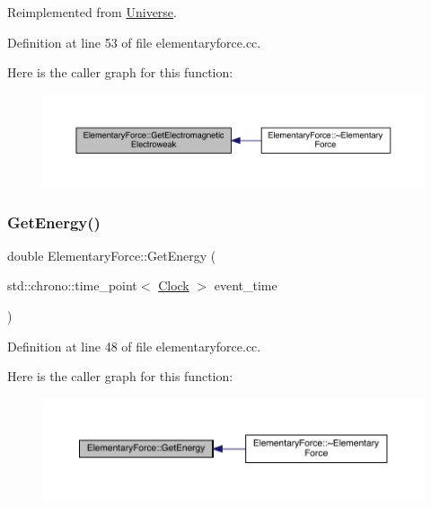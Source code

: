 Reimplemented from \hyperlink{class_universe_a9f099605c082e7fa755787a6a8cab7ba}{Universe}.



Definition at line 53 of file elementaryforce.\+cc.

Here is the caller graph for this function\+:
\nopagebreak
\begin{figure}[H]
\begin{center}
\leavevmode
\includegraphics[width=350pt]{class_elementary_force_a58e503f2f3a7410f034a2a04bca560d1_icgraph}
\end{center}
\end{figure}
\mbox{\label{class_elementary_force_af608447a2b6380142e2345ada11d1c32}} 
\subsubsection{\texorpdfstring{Get\+Energy()}{GetEnergy()}}
{\footnotesize\ttfamily double Elementary\+Force\+::\+Get\+Energy (\begin{DoxyParamCaption}\item[{std\+::chrono\+::time\+\_\+point$<$ \hyperlink{universe_8h_a0ef8d951d1ca5ab3cfaf7ab4c7a6fd80}{Clock} $>$}]{event\+\_\+time }\end{DoxyParamCaption})}



Definition at line 48 of file elementaryforce.\+cc.

Here is the caller graph for this function\+:
\nopagebreak
\begin{figure}[H]
\begin{center}
\leavevmode
\includegraphics[width=350pt]{class_elementary_force_af608447a2b6380142e2345ada11d1c32_icgraph}
\end{center}
\end{figure}
\mbox{\label{class_elementary_force_a579afb8079668f0587096934d1de9c04}} 
